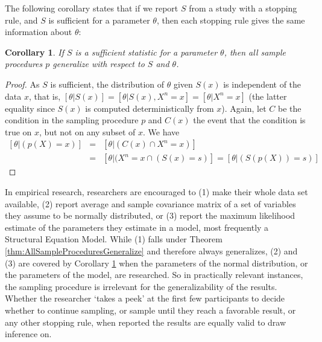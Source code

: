 \documentclass[man]{apa7}
\newtheorem{cor}[thm]{Corollary}
\theoremstyle{definition}
\begin{document}
The following corollary states that if we report $S$ from a study with a stopping rule, and $S$ is sufficient for a parameter $\theta$, then each stopping rule gives the same information about $\theta$:

\begin{cor} \label{cor:GenalizeWRTSufficient}
If $S$ is a sufficient statistic for a parameter $\theta$, then all sample procedures $p$ generalize with respect to $S$ and $\theta$.
\end{cor}
\begin{proof}
As $S$ is sufficient, the distribution of $\theta$ given $S(x)$ is independent of the data $x$, that is, $\left[\theta|S(x)\right] = \left[\theta|S(x),X^n = x\right] = \left[\theta|X^n = x\right]$ (the latter equality since $S(x)$ is computed deterministically from $x$). Again, let $C$ be the condition in the sampling procedure $p$ and $C(x)$ the event that the condition is true on $x$, but not on any subset of $x$. We have
\begin{eqnarray}
\left[\theta|(p(X) = x) \right] &=& \left[\theta|(C(x) \cap X^n = x)\right] \\
&=& \left[\theta|(X^n = x \cap (S(x) = s)\right] = \left[\theta | (S(p(X)) = s)\right] 
\end{eqnarray}
\end{proof}

In empirical research, researchers are encouraged to (1) make their whole data set available, (2) report average and sample covariance matrix of a set of variables they assume to be normally distributed, or (3) report the maximum likelihood estimate of the parameters they estimate in a model, most frequently a Structural Equation Model. While (1) falls under Theorem \ref{thm:AllSampleProceduresGeneralize} and therefore always generalizes, (2) and (3) are covered by Corollary \ref{cor:GenalizeWRTSufficient} when the parameters of the normal distribution, or the parameters of the model, are researched. So in practically relevant instances, the sampling procedure is irrelevant for the generalizability of the results. Whether the researcher `takes a peek' at the first few participants to decide whether to continue sampling, or sample until they reach a favorable result, or any other stopping rule, when reported the results are equally valid to draw inference on. 
\end{document}
